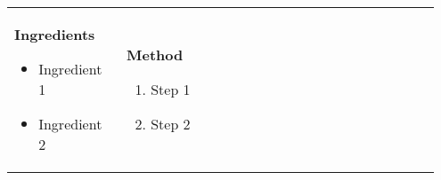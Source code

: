
\begin{tabular}{ p{0.25\linewidth} p{0.7\linewidth} }
  {
    \textbf{Ingredients}

    \begin{itemize}[label={},leftmargin=*]
      \item Ingredient 1
      \item Ingredient 2
    \end{itemize}
  } & {
    \textbf{Method}

    \begin{enumerate}
      \item Step 1
      \item Step 2
    \end{enumerate}
  } \\
\end{tabular}